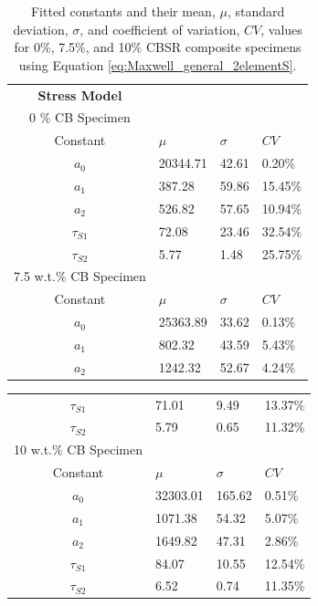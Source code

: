 \begin{table}[h!]
	\caption{Fitted constants and their mean, $\mu$, standard deviation, $\sigma$, and coefficient of variation, $CV$, values for 0\%, 7.5\%, and 10\% CBSR composite specimens using Equation \ref{eq:Maxwell_general_2elementS}.}
	\begin{center}
		\label{tab:generalised_model_constants}
		\begin{tabular}{c l l l}
			\textbf{Stress Model} \\
			0 \% CB Specimen \\
			Constant & $\mu$ & $\sigma$ & $CV$ \\
			\hline
			$a_0$ & 20344.71 & 42.61 & 0.20\% \\
			$a_1$ & 387.28 & 59.86 & 15.45\% \\
			$a_2$ & 526.82 & 57.65 & 10.94\% \\
			$\tau_{S1}$ & 72.08 & 23.46 & 32.54\% \\
			$\tau_{S2}$ & 5.77 & 1.48 & 25.75\% \\
			\hline
			7.5 w.t.\% CB Specimen \\
			Constant & $\mu$ & $\sigma$ & $CV$ \\
			\hline
			$a_0$ & 25363.89 & 33.62 & 0.13\% \\
			$a_1$ & 802.32 & 43.59 & 5.43\% \\
			$a_2$ & 1242.32 & 52.67 & 4.24\% \\
		\end{tabular}
	\end{center}
\end{table}
\begin{table}[h!]
	\begin{center}
		\label{tab:generalised_model_constants}
		\begin{tabular}{c l l l}
			$\tau_{S1}$ & 71.01 & 9.49 & 13.37\% \\
			$\tau_{S2}$ & 5.79 & 0.65 & 11.32\% \\
			\hline
			10 w.t.\% CB Specimen \\
			Constant & $\mu$ & $\sigma$ & $CV$ \\
			\hline
			$a_0$ & 32303.01 & 165.62 & 0.51\% \\
			$a_1$ & 1071.38 & 54.32 & 5.07\% \\
			$a_2$ & 1649.82 & 47.31 & 2.86\% \\
			$\tau_{S1}$ & 84.07 & 10.55 & 12.54\% \\
			$\tau_{S2}$ & 6.52 & 0.74 & 11.35\% \\
			\hline
		\end{tabular}
	\end{center}
\end{table}
